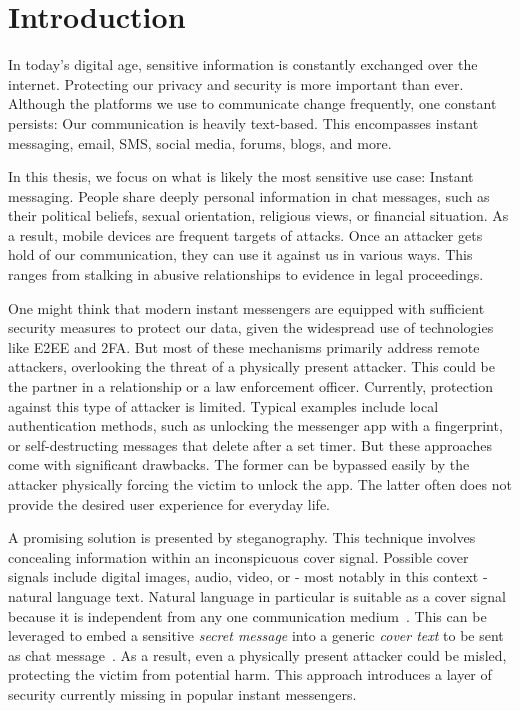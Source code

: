 
\chapter{Introduction}\label{ch:introduction}
\glsresetall %

In today's digital age, sensitive information is constantly exchanged over the internet. Protecting our privacy and security is more important than ever. Although the platforms we use to communicate change frequently, one constant persists: Our communication is heavily text-based. This encompasses instant messaging, email, \gls{SMS}, social media, forums, blogs, and more.

In this thesis, we focus on what is likely the most sensitive use case: Instant messaging. People share deeply personal information in chat messages, such as their political beliefs, sexual orientation, religious views, or financial situation. As a result, mobile devices are frequent targets of attacks. Once an attacker gets hold of our communication, they can use it against us in various ways. This ranges from stalking in abusive relationships to evidence in legal proceedings.

One might think that modern instant messengers are equipped with sufficient security measures to protect our data, given the widespread use of technologies like \gls{E2EE} and \gls{2FA}. But most of these mechanisms primarily address remote attackers, overlooking the threat of a physically present attacker. This could be the partner in a relationship or a law enforcement officer. Currently, protection against this type of attacker is limited. Typical examples include local authentication methods, such as unlocking the messenger app with a fingerprint, or self-destructing messages that delete after a set timer. But these approaches come with significant drawbacks. The former can be bypassed easily by the attacker physically forcing the victim to unlock the app. The latter often does not provide the desired user experience for everyday life.

A promising solution is presented by steganography. This technique involves concealing information within an inconspicuous cover signal. Possible cover signals include digital images, audio, video, or - most notably in this context - natural language text. Natural language in particular is suitable as a cover signal because it is independent from any one communication medium~\cite{zieglerNeuralLinguisticSteganography2019}. This can be leveraged to embed a sensitive \textit{secret message} into a generic \textit{cover text} to be sent as chat message~\cite{zieglerNeuralLinguisticSteganography2019}. As a result, even a physically present attacker could be misled, protecting the victim from potential harm. This approach introduces a layer of security currently missing in popular instant messengers.

